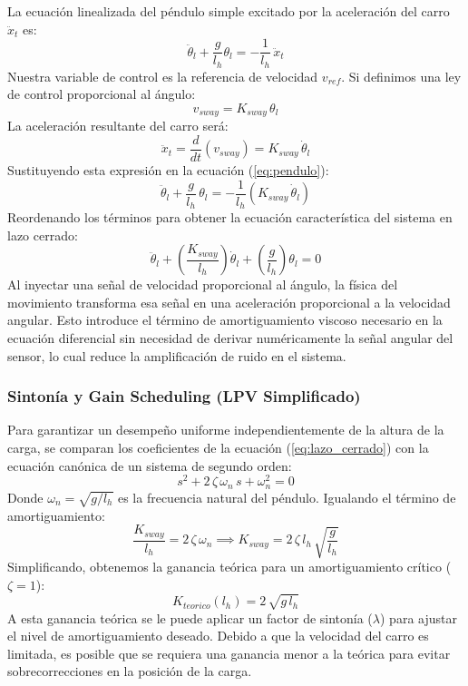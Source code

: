 \documentclass[11pt]{article}                                    %
\begin{document}
La ecuación linealizada del péndulo simple excitado por la aceleración del carro $\ddot{x}_t$ es:
\begin{equation}
    \ddot{\theta}_l + \frac{g}{l_h}\theta_l = -\frac{1}{l_h}\,\ddot{x}_t
    \label{eq:pendulo}
\end{equation}
Nuestra variable de control es la referencia de velocidad $v_{ref}$. Si definimos una ley de control proporcional al ángulo:
\begin{equation}
    v_{sway} = K_{sway} \, \theta_l
    \label{eq:ley_control}
\end{equation}
La aceleración resultante del carro será:
\begin{equation}
    \ddot{x}_t = \frac{d}{dt}(v_{sway}) = K_{sway} \, \dot{\theta}_l
\end{equation}
Sustituyendo esta expresión en la ecuación (\ref{eq:pendulo}):
\begin{equation}
    \ddot{\theta}_l + \frac{g}{l_h} \, \theta_l = -\frac{1}{l_h} (K_{sway} \, \dot{\theta}_l)
\end{equation}
Reordenando los términos para obtener la ecuación característica del sistema en lazo cerrado:
\begin{equation}
    \ddot{\theta}_l + \left( \frac{K_{sway}}{l_h} \right) \dot{\theta}_l + \left( \frac{g}{l_h} \right) \theta_l = 0
    \label{eq:lazo_cerrado}
\end{equation}
Al inyectar una señal de velocidad proporcional al ángulo, la física del movimiento transforma esa señal en una aceleración proporcional a la velocidad angular. Esto introduce el término de amortiguamiento viscoso necesario en la ecuación diferencial sin necesidad de derivar numéricamente la señal angular del sensor, lo cual reduce la amplificación de ruido en el sistema.

\subsubsection{Sintonía y Gain Scheduling (LPV Simplificado)}
Para garantizar un desempeño uniforme independientemente de la altura de la carga, se comparan los coeficientes de la ecuación (\ref{eq:lazo_cerrado}) con la ecuación canónica de un sistema de segundo orden:
\begin{equation}
    s^2 + 2 \, \zeta \, \omega_n \, s + \omega_n^2 = 0
\end{equation}
Donde $\omega_n = \sqrt{g/l_h}$ es la frecuencia natural del péndulo. Igualando el término de amortiguamiento:
\begin{equation}
    \frac{K_{sway}}{l_h} = 2 \, \zeta \, \omega_n \implies K_{sway} = 2 \, \zeta \, l_h \, \sqrt{\frac{g}{l_h}}
\end{equation}
Simplificando, obtenemos la ganancia teórica para un amortiguamiento crítico ($\zeta = 1$):
\begin{equation}
    K_{teorico}(l_h) = 2 \,\sqrt{g \, l_h}
\end{equation}
A esta ganancia teórica se le puede aplicar un factor de sintonía ($\lambda$) para ajustar el nivel de amortiguamiento deseado. Debido a que la velocidad del carro es limitada, es posible que se requiera una ganancia menor a la teórica para evitar sobrecorrecciones en la posición de la carga.
\end{document}
